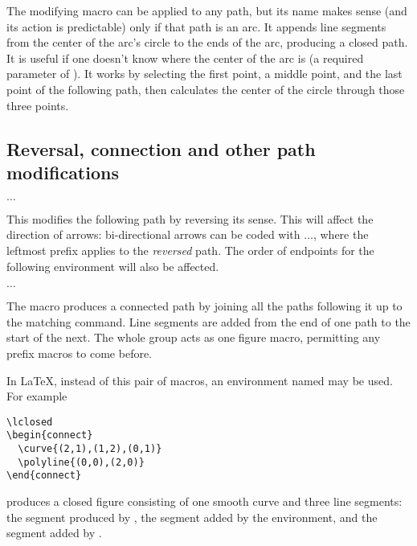 \documentclass[letterpaper]{article}
\begin{document}
The modifying macro  can be applied to any path, but its
name makes sense (and its action is predictable) only if that path is an
arc. It appends line segments from the center of the arc's circle to the
ends of the arc, producing a closed path. It is useful if one doesn't
know where the center of the arc is (a required parameter of
). It works by selecting the first point, a middle point, and
the last point of the following path, then calculates the center of the
circle through those three points.


\subsection{Reversal, connection and other path modifications}%
\label{reversal}

\begin{cd}
$\ldots$%
\end{cd}

This modifies the following path by reversing its sense. This will
affect the direction of arrows: bi-directional arrows can be coded with
$\ldots$, where the leftmost 
prefix applies to the \emph{reversed} path. The order of endpoints for
the following  environment will also be affected.


\begin{cd}
 $\ldots$ %
%
\end{cd}

The macro  produces a connected path by joining all the
paths following it up to the matching  command. Line
segments are added from the end of one path to the start of the next.
The whole group acts as one figure macro, permitting any prefix macros
to come before.

In \LaTeX{}, instead of this pair of macros, an environment named
 may be used. For example
\begin{verbatim}
\lclosed
\begin{connect}
  \curve{(2,1),(1,2),(0,1)}
  \polyline{(0,0),(2,0)}
\end{connect}
\end{verbatim}
produces a closed figure consisting of one smooth curve and three line
segments: the segment produced by , the segment added by
the  environment, and the segment added by .
\end{document}
